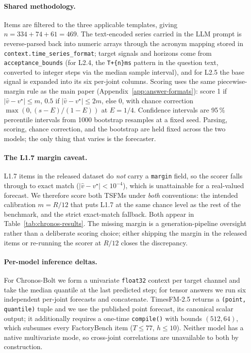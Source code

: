 \paragraph{Shared methodology.} Items are filtered to the three applicable templates, giving $n = 334 + 74 + 61 = 469$. The text-encoded series carried in the LLM prompt is reverse-parsed back into numeric arrays through the acronym mapping stored in \texttt{context.time\_series\_format}; target signals and horizons come from \texttt{acceptance\_bounds} (for L2.4, the \texttt{T+\{n\}ms} pattern in the question text, converted to integer steps via the median sample interval), and for L2.5 the base signal is expanded into its six per-joint columns. Scoring uses the same piecewise-margin rule as the main paper (Appendix~\ref{app:answer-formats}): score 1 if $|\hat v - v^\star| \le m$, $0.5$ if $|\hat v - v^\star| \le 2m$, else 0, with chance correction $\max(0,(s-E)/(1-E))$ at $E=1/4$. Confidence intervals are 95\,\% percentile intervals from 1000 bootstrap resamples at a fixed seed. Parsing, scoring, chance correction, and the bootstrap are held fixed across the two models; the only thing that varies is the forecaster.

\paragraph{The L1.7 margin caveat.} L1.7 items in the released dataset do \emph{not} carry a \texttt{margin} field, so the scorer falls through to exact match ($|\hat v - v^\star| < 10^{-4}$), which is unattainable for a real-valued forecast. We therefore score both TSFMs under \emph{both} conventions: the intended calibration $m = R/12$ that puts L1.7 at the same chance level as the rest of the benchmark, and the strict exact-match fallback. Both appear in Table~\ref{tab:chronos-results}. The missing margin is a generation-pipeline oversight rather than a deliberate scoring choice; either shipping the margin in the released items or re-running the scorer at $R/12$ closes the discrepancy.

\paragraph{Per-model inference deltas.} For Chronos-Bolt we form a univariate \texttt{float32} context per target channel and take the median quantile at the last predicted step; for tensor answers we run six independent per-joint forecasts and concatenate. TimesFM-2.5 returns a \texttt{(point, quantile)} tuple and we use the published point forecast, its canonical scalar output; it additionally requires a one-time \texttt{compile()} with bounds $(512, 64)$, which subsumes every FactoryBench item ($T \le 77$, $h \le 10$). Neither model has a native multivariate mode, so cross-joint correlations are unavailable to both by construction.

